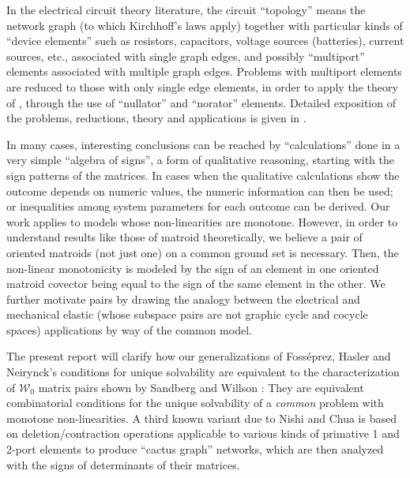 \documentclass{article}
\newcommand{\extra}[1]{{\small{#1}}}
\begin{document}
\extra{

In the electrical circuit theory literature, the circuit ``topology''
means the network graph (to which Kirchhoff's laws apply)
together with particular kinds of ``device elements''
such as resistors, capacitors, voltage sources (batteries), 
current sources, etc., associated with single graph edges, and possibly
``multiport'' elements associated with multiple graph edges.
Problems with multiport elements are reduced to 
those with only single edge elements, in order to apply
the theory of  \cite{HaslerDApplMath},  through the use of 
``nullator'' and ``norator'' elements.  Detailed exposition of the problems,
reductions, theory and applications is given in \cite{HaslerNeirynck}.

}

In many cases, interesting conclusions can be reached by 
``calculations'' done in a very simple ``algebra of signs'', a 
form of qualitative reasoning, 
starting with the sign patterns of the matrices.  In cases when
the qualitative calculations show the outcome depends on numeric
values, the numeric information can then be used; or inequalities
among system parameters for each outcome can be derived.  
Our work
applies to models whose non-linearities are monotone.  However, in order
to understand results like those of 
\cite{HaslerDApplMath,HaslerNeirynck} matroid theoretically, 
we believe
a pair of oriented matroids (not just one) 
on a common ground set is necessary.
Then, the non-linear monotonicity is modeled by the sign
of an element in one oriented matroid covector being equal to the sign of
the same element in the other.
We further motivate pairs
by drawing 
the analogy between the electrical and mechanical elastic (whose subspace
pairs are not graphic cycle and cocycle spaces)
applications by way of the common model.  


The present report will clarify how our 
generalizations of Foss\'{e}prez, Hasler and Neirynck's conditions
for unique solvability
are equivalent to the characterization of $\mathcal{W}_0$ matrix pairs
shown by Sandberg and Willson \cite{SWExistancePf,W0APPLpaper}:
They are equivalent combinatorial 
conditions for the unique solvability
of a \textit{common}
problem with monotone non-linearities.
A third known variant due to Nishi and Chua 
\cite{NishiChuaCactus,NishiChuaCCCS} is based on 
deletion/contraction operations applicable
to various kinds of primative
1 and 2-port elements to produce ``cactus graph'' networks,
which are then analyzed with the signs of determinants 
of their matrices.
\end{document}
